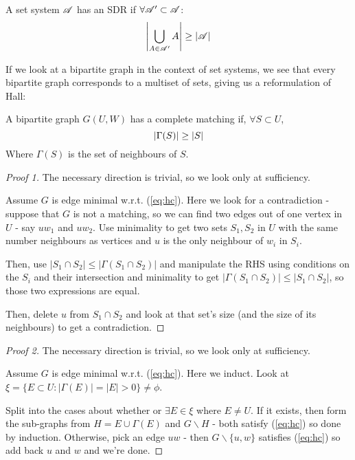 \documentclass[a4paper]{article}
\begin{document}
{\begin{thm}[1, Hall, 1935]
	A set system $\mathscr{A}$ has an SDR if $\forall\mathscr{A}'\subset\mathscr{A}$:
	$$\left|\bigcup_{A\in\mathscr{A}'}A\right|\geq\left|\mathscr{A}\right|$$
\end{thm}

If we look at a bipartite graph in the context of set systems, we see that every bipartite graph corresponds to a multiset of sets, giving us a reformulation of Hall:

\begin{thm}[$1'$]
	A bipartite graph $G(U,W)$ has a complete matching if, $\forall S\subset U$,
	\begin{equation}\index{Hall!criterion}\label{eq:hc}
		\left|\Gamma(S)\right|\geq|S|
	\end{equation}
	Where $\Gamma(S)$ is the set of neighbours of $S$.
\end{thm}
\begin{proof}[Proof 1]
	The necessary direction is trivial, so we look only at sufficiency.
	
	Assume $G$ is edge minimal w.r.t. (\ref{eq:hc}). Here we look for a contradiction - suppose that $G$ is not a matching, so we can find two edges out of one vertex in $U$ - say $uw_1$ and $uw_2$. Use minimality to get two sets $S_1, S_2$ in $U$ with the same number neighbours as vertices and $u$ is the only neighbour of $w_i$ in $S_i$.
	
	Then, use $\left|S_1\cap S_2\right|\leq\left|\Gamma\left(S_1\cap S_2\right)\right|$ and manipulate the RHS using conditions on the $S_i$ and their intersection and minimality to get $\left|\Gamma\left(S_1\cap S_2\right)\right|\leq\left|S_1\cap S_2\right|$, so those two expressions are equal.
	
	Then, delete $u$ from $S_1\cap S_2$ and look at that set's size (and the size of its neighbours) to get a contradiction.
\end{proof}
\begin{proof}[Proof 2]
	The necessary direction is trivial, so we look only at sufficiency.
		
	Assume $G$ is edge minimal w.r.t. (\ref{eq:hc}). Here we induct. Look at $\xi=\{E\subset U : \left|\Gamma(E)\right|=|E|>0\}\neq\phi$.
	
	Split into the cases about whether or $\exists E\in \xi$ where $E\neq U$. If it exists, then form the sub-graphs from $H=E\cup\Gamma(E)$ and $G\smallsetminus H$ - both satisfy (\ref{eq:hc}) so done by induction. Otherwise, pick an edge $uw$ - then $G\smallsetminus \{u,w\}$ satisfies (\ref{eq:hc}) so add back $u$ and $w$ and we're done.
\end{proof}

}
\end{document}
